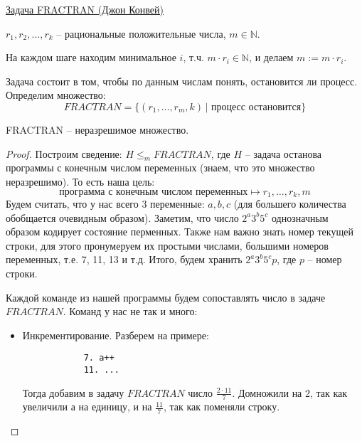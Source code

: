 \underline{Задача FRACTRAN (Джон Конвей)}

$r_1, r_2, \dots, r_k$ -- рациональные положительные числа, $m \in \mathbb{N}$.

На каждом шаге находим минимальное $i$, т.ч. $m \cdot r_i \in \mathbb{N}$, и делаем $m := m \cdot r_i$.

Задача состоит в том, чтобы по данным числам понять, остановится ли процесс. Определим множество: \[ FRACTRAN = \{ (r_1, \dots, r_m, k) \, | \text{ процесс остановится} \} \]

\begin{theorem}
    FRACTRAN -- неразрешимое множество.
\end{theorem}
\begin{proof}
    Построим сведение: $H \leqslant_m FRACTRAN$, где $H$ -- задача останова программы с конечным числом переменных (знаем, что это множество неразрешимо). То есть наша цель: \[ \text{программа с конечным числом переменных} \mapsto r_1, \dots, r_k, m \]
    Будем считать, что у нас всего 3 переменные: $a, b, c$ (для большего количества обобщается очевидным образом). Заметим, что число $2^a3^b5^c$ однозначным образом кодирует состояние перменных. Также нам важно знать номер текущей строки, для этого пронумеруем их простыми числами, большими номеров переменных, т.е. 7, 11, 13 и т.д. Итого, будем хранить  $2^a3^b5^cp$, где $p$ -- номер строки. 

    Каждой команде из нашей программы будем сопоставлять число в задаче $FRACTRAN$. Команд у нас не так и много: \begin{itemize}
        \item Инкрементирование. Разберем на примере: \begin{lstlisting}
            7. a++
            11. ...
        \end{lstlisting}
        Тогда добавим в задачу $FRACTRAN$ число $\frac{2 \cdot 11}{7}$. Домножили на 2, так как увеличили а на единицу, и на $\frac{11}{7}$, так как поменяли строку.


\end{itemize}
\end{proof}
